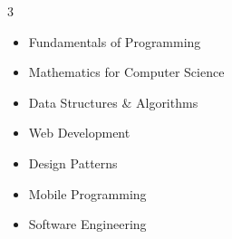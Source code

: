 \vspace{-4mm}
\begin{multicols}{3}
\begin{itemize}
\setlength\itemsep{0em}
\item Fundamentals of Programming
\item Mathematics for Computer Science
\item Data Structures \& Algorithms
\item Web Development
\item Design Patterns
\item Mobile Programming
\item Software Engineering
\end{itemize}
\end{multicols}